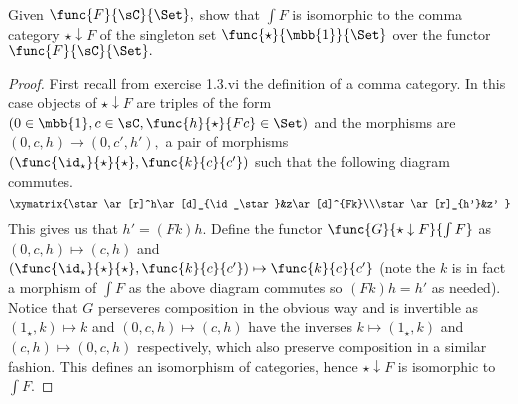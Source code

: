 \documentclass[main.tex]{subfiles}
\begin{document}
\paragraph{}

\begin{exercise}
Given $ \func{F}{\sC}{\Set},$ show that $ \int F $ is isomorphic to the comma 
category $ \star\downarrow F $ of the singleton set $ 
\func{\star}{\mbb{1}}{\Set} $ over the functor $ \func{F}{\sC}{\Set}. $
\end{exercise}
\begin{proof}
	First recall from exercise 1.3.vi the definition of a comma category. In 
	this case objects of $ \star\downarrow F $ are triples of the form $ (0\in 
	\mbb{1},c\in 
	\sC,\func{h}{\star}{Fc}\in \Set) $ and the morphisms are $ (0,c,h)\to(0,c',h'),$ 
	a pair of morphisms $ (\func{\id_\star}{\star}{\star},\func{k}{c}{c'}) $ such that the
	following diagram commutes.
	\[
	\xymatrix{\star\ar[r]^h\ar[d]_{\id_\star}&z\ar[d]^{Fk}\\\star\ar[r]_{h'}&z'
	}
	\]
	This gives us that $ h'=(Fk)h.$
	Define the functor $ \func{G}{\star\downarrow F}{\int F} $ as $ (0,c,h)\mapsto 
	(c,h) $ and $ (\func{\id_\star}{\star}{\star},\func{k}{c}{c'})\mapsto \func{k}{c}{c'} $ 
	(note the $ k $ is in fact a morphism of $ \int F $ as the above diagram 
	commutes so $ (Fk)h=h' $ as needed). Notice that $ G $ perseveres 
	composition in the obvious way and
	 is invertible as $(1_\star,k)\mapsto k$ and  $ (0,c,h)\mapsto  (c,h) $ 
	 have the inverses $ k\mapsto (1_\star,k) $ and $ (c,h)\mapsto (0,c,h)$ 
	 respectively, which also preserve composition in a similar fashion. This defines an isomorphism of categories, hence $ \star\downarrow F $ is isomorphic to $ \int F. $
\end{proof}
\end{document}

